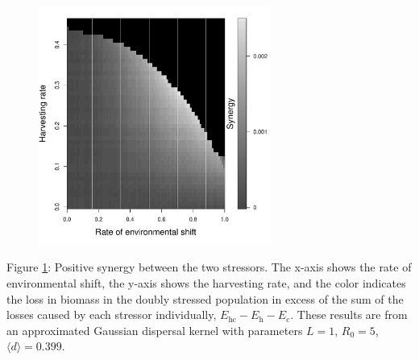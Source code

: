\documentclass[12pt,english]{article}
\begin{document}
\begin{spacing}{1.9}
\begin{flushleft}
\pagebreak

\begin{figure}[htbp]
\begin{center}
\includegraphics[width=3in]{plots/synergy.pdf}
\caption{
}
\label{Synergy}
\end{center}
\end{figure}

\pagebreak

Figure \ref{Synergy}: Positive synergy between the two stressors.  The x-axis shows the rate of environmental shift, the y-axis shows the harvesting rate, and the color indicates the loss in biomass in the doubly stressed population in excess of the sum of the losses caused by each stressor individually, $E_\text{hc}-E_\text{h}-E_\text{c}$.  These results are from an approximated Gaussian dispersal kernel with parameters $L=1$, $R_0=5$, $\langle d \rangle = 0.399$.

\pagebreak

\begin{figure}[htbp]


\end{figure}
\end{flushleft}
\end{spacing}
\end{document}
